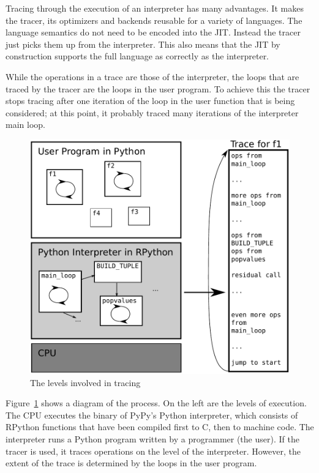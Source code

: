 \documentclass[preprint]{sigplanconf}
\begin{document}
Tracing through the execution of an interpreter has many advantages. It makes
the tracer, its optimizers and backends reusable for a variety of languages. The
language semantics do not need to be encoded into the JIT. Instead the tracer
just picks them up from the interpreter. This also means that the JIT by
construction supports the full language as correctly as the interpreter.

While the operations in a trace are those of the interpreter, the loops that are
traced by the tracer are the loops in the
user program. To achieve this the tracer stops tracing after one iteration of
the loop in the user function that is being considered; at this point, it probably
traced many iterations of the interpreter main loop.

\begin{figure}
\includegraphics[scale=0.45]{figures/trace-levels}
\caption{The levels involved in tracing}
\label{fig:trace-levels}
\end{figure}

Figure~\ref{fig:trace-levels} shows a diagram of the process. On the left are
the levels of execution. The CPU executes the binary of
PyPy's Python interpreter, which consists of RPython functions that have been
compiled first to C, then to machine code. The interpreter runs a Python program written by a
programmer (the user). If the tracer is used, it traces operations on the level
of the interpreter. However, the extent of the trace is determined by the loops
in the user program.
\end{document}
